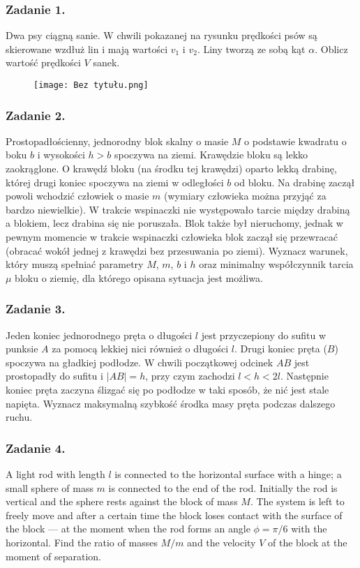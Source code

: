 \documentclass[a4paper, twocolumn]{article}
\begin{document}
\subsubsection*{Zadanie 1.} 
Dwa psy ciągną sanie. W chwili pokazanej na rysunku prędkości psów są skierowane wzdłuż lin i mają wartości \(v_1\) i \(v_2\). Liny tworzą ze sobą kąt \(\alpha\). Oblicz wartość prędkości \(V\) sanek.
\begin{figure}[h!]
    \centering
    \texttt{[image: Bez tytułu.png]}
    \label{fig:my_label}
\end{figure}
\subsubsection*{Zadanie 2.} 
Prostopadłościenny, jednorodny blok skalny o masie \(M\) o podstawie kwadratu o boku \(b\) i wysokości \(h>b\) spoczywa na ziemi. Krawędzie bloku są lekko zaokrąglone. O krawędź bloku (na środku tej krawędzi) oparto lekką drabinę, której drugi koniec spoczywa na ziemi w odległości \(b\) od bloku. Na drabinę zaczął powoli wchodzić człowiek o masie \(m\) (wymiary człowieka można przyjąć za bardzo niewielkie). W trakcie wspinaczki nie występowało tarcie między drabiną a blokiem, lecz drabina się nie poruszała. Blok także był nieruchomy, jednak w pewnym momencie w trakcie wspinaczki człowieka blok zaczął się przewracać (obracać wokół jednej z krawędzi bez przesuwania po ziemi). Wyznacz warunek, który muszą spełniać parametry \(M\), \(m\), \(b\) i \(h\) oraz minimalny współczynnik tarcia \(\mu\) bloku o ziemię, dla którego opisana sytuacja jest możliwa.

\subsubsection*{Zadanie 3.}
Jeden koniec jednorodnego pręta o długości \(l\) jest przyczepiony do sufitu w punksie \(A\) za pomocą lekkiej nici również o długości \(l\). Drugi koniec pręta (\(B\)) spoczywa na gładkiej podłodze. W chwili początkowej odcinek \(AB\) jest prostopadły do sufitu i \(|AB|=h\), przy czym zachodzi \(l<h<2l\). Następnie koniec pręta zaczyna ślizgać się po podłodze w taki sposób, że nić jest stale napięta. Wyznacz maksymalną szybkość środka masy pręta podczas dalszego ruchu.

\subsubsection*{Zadanie 4.}
A light rod with length \(l\) is connected to the horizontal surface with a hinge; a small sphere of mass \(m\) is connected to the end of the rod. Initially the rod is vertical and the sphere rests against the block of mass \(M\). The system is left to freely move and after a certain time the block loses contact with the surface of the block — at the moment when the rod forms an angle \(\phi=\pi/6\) with the horizontal. Find the ratio of masses \(M/m\) and the velocity \(V\) of the block at the moment of separation.
\end{document}
